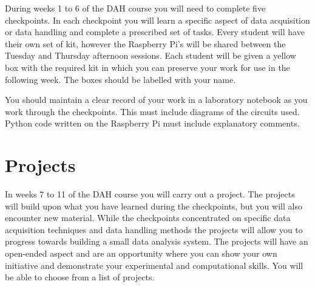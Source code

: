 During weeks 1 to 6 of the DAH course you will need to complete five checkpoints. %
In each checkpoint you will learn a specific aspect of data acquisition or data handling and complete a prescribed set of tasks.
Every student will have their own set of kit, however the Raspberry Pi's will be shared between the Tuesday and Thursday afternoon sessions.
Each student will be given a yellow box with the required kit in which you can preserve your work for use in the following week.
The boxes should be labelled with your name.

You should maintain a clear record of your work in a laboratory notebook as you work through the checkpoints.
This must include diagrams of the circuits used.
Python code written on the Raspberry Pi must include explanatory comments. %

\section{Projects}

In weeks 7 to 11 of the DAH course you will carry out a project. %
The projects will build upon what you have learned during the checkpoints, but you will also encounter new material.
While the checkpoints concentrated on specific data acquisition techniques and data handling methods the projects will allow you to progress towards building a small data analysis system. %
The projects will have an open-ended aspect and are an opportunity where you can show your own initiative and demonstrate your experimental and computational skills. 
You will be able to choose from a list of projects. %


